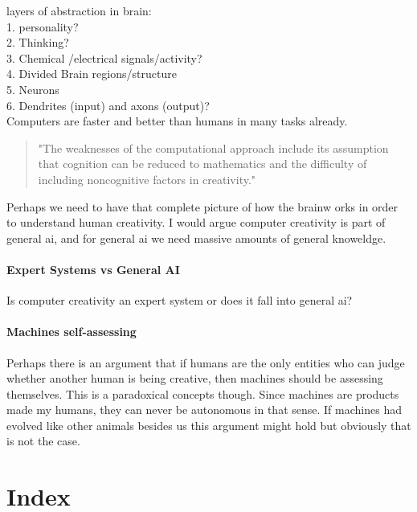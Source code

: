 layers of abstraction in brain:\\
1.	personality?\\
2.	Thinking?\\
3.	Chemical /electrical signals/activity?\\
4.	Divided Brain regions/structure\\
5.	Neurons\\
6.	Dendrites (input) and axons (output)?\\


Computers are faster and better than humans in many tasks already.

\begin{quote}
"The weaknesses of the computational approach include its assumption that cognition can be reduced to mathematics and the difficulty of including noncognitive factors in creativity." \autocite[p.457]{Mayer1999}
\end{quote}


Perhaps we need to have that complete picture of how the brainw orks in order to understand human creativity. I would argue computer creativity is part of general \gls{ai}, and for general \gls{ai} we need massive amounts of general knoweldge.
\paragraph{Expert Systems vs General AI}
Is computer creativity an expert system or does it fall into general \gls{ai}? 

\paragraph{Machines self-assessing}
Perhaps there is an argument that if humans are the only entities who can judge whether another human is being creative, then machines should be assessing themselves. This is a paradoxical concepts though. Since machines are products made my humans, they can never be autonomous in that sense. If machines had evolved like other animals besides us this argument might hold but obviously that is not the case.



\section{Index}

